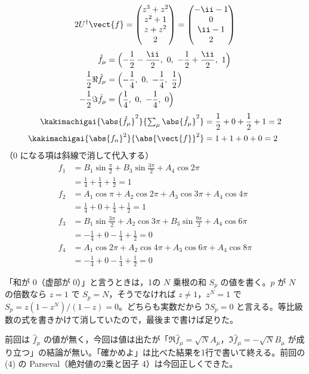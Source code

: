 \[
  2U^{\dagger}\vect{f}=\begin{pmatrix}z^{3}+z^{2}\\z^{2}+1\\z+z^{2}\\2\end{pmatrix}=\begin{pmatrix}-\ii-1\\0\\\ii-1\\2\end{pmatrix}
\]
\begin{align*}
  \hat{f}_{\mu}&=\Bigl(-\frac{1}{2}-\frac{\ii}{2},\ 0,\ -\frac{1}{2}+\frac{\ii}{2},\ 1\Bigr)\\
  \frac{1}{2}\Re\hat{f}_{\mu}&=\Bigl(-\frac{1}{4},\ 0,\ -\frac{1}{4},\ \frac{1}{2}\Bigr)\\
  -\frac{1}{2}\Im\hat{f}_{\mu}&=\Bigl(\frac{1}{4},\ 0,\ -\frac{1}{4},\ 0\Bigr)
\end{align*}
\begin{align*}
  \kakimachigai{\abs{\hat{f}_{\mu}}^{2}}{\textstyle\sum_{\mu}\abs{\hat{f}_{\mu}}^{2}}&=\frac{1}{2}+0+\frac{1}{2}+1=2\\
  \kakimachigai{\abs{f_n}^{2}}{\abs{\vect{f}}^{2}}&=1+1+0+0=2
\end{align*}
（0 になる項は斜線で消して代入する）
\begin{align*}
  f_1&=B_1\sin\frac{\pi}{2}+B_3\sin\frac{3\pi}{2}+A_4\cos2\pi\\
  &=\frac{1}{4}+\frac{1}{4}+\frac{1}{2}=1\\
  f_2&=A_1\cos\pi+A_2\cos2\pi+A_3\cos3\pi+A_4\cos4\pi\\
  &=\frac{1}{4}+0+\frac{1}{4}+\frac{1}{2}=1\\
  f_3&=B_1\sin\frac{3\pi}{2}+A_2\cos3\pi+B_3\sin\frac{9\pi}{2}+A_4\cos6\pi\\
  &=-\frac{1}{4}+0-\frac{1}{4}+\frac{1}{2}=0\\
  f_4&=A_1\cos2\pi+A_2\cos4\pi+A_3\cos6\pi+A_4\cos8\pi\\
  &=-\frac{1}{4}+0-\frac{1}{4}+\frac{1}{2}=0
\end{align*}
\item {} 「和が 0（虚部が 0）」と言うときは，1の $N$ 乗根の和 $S_p$ の値を書く。$p$ が $N$ の倍数なら $z=1$ で $S_p=N$，そうでなければ $z\neq1$，$z^{N}=1$ で $S_p=z(1-z^{N})/(1-z)=0$。どちらも実数だから $\Im S_p=0$ と言える。等比級数の式を書きかけて消していたので，最後まで書けば足りた。
\item {} 前回は $\hat{f}_{\mu}$ の値が無く，今回は値は出たが「$\Re\hat{f}_{\mu}=\sqrt{N}A_{\mu}$，$\Im\hat{f}_{\mu}=-\sqrt{N}B_{\mu}$ が成り立つ」の結論が無い。「確かめよ」は比べた結果を1行で書いて終える。前回の (4) の Parseval（絶対値の2乗と因子 4）は今回正しくできた。
